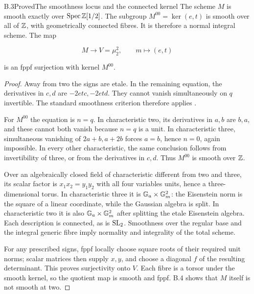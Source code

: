 \begin{statement}{B.3}{Proved}{The smoothness locus and the connected kernel}
The scheme $M$ is smooth exactly over $\operatorname{Spec}\mathbb Z[1/2]$.
The subgroup $M^{00}=\ker(e,t)$ is smooth over all of $\mathbb Z$,
with geometrically connected fibres. It is therefore a
normal integral scheme. The map

$$
M\longrightarrow V=\mu_2^2,\qquad m\longmapsto(e,t)
$$

is an fppf surjection with kernel $M^{00}$.
\end{statement}
\begin{proof}
Away from two the signs are etale. In the remaining equation,
the derivatives in $c,d$ are $-2etc,-2etd$.
They cannot vanish simultaneously on $q$ invertible.
The standard smoothness criterion therefore applies
\cite[Lemma10.137.6]{AB_Stacks}.

For $M^{00}$ the equation is $n=q$.
In characteristic two, its derivatives in $a,b$ are $b,a$,
and these cannot both vanish because $n=q$ is a unit.
In characteristic three, simultaneous vanishing of
$2a+b,a+2b$ forces $a=b$, hence $n=0$, again impossible.
In every other characteristic, the same conclusion follows
from invertibility of three, or from the derivatives in $c,d$.
Thus $M^{00}$ is smooth over $\mathbb Z$.

Over an algebraically closed field of characteristic different
from two and three, its scalar factor is
$x_1x_2=y_1y_2$ with all four variables units, hence a
three-dimensional torus. In characteristic three it is
$\mathbb G_a\times\mathbb G_m^2$: the Eisenstein norm is the square of a
linear coordinate, while the Gaussian algebra is split.
In characteristic two it is also $\mathbb G_a\times\mathbb G_m^2$ after
splitting the etale Eisenstein algebra.
Each description is connected, as is $\operatorname{SL}_2$.
Smoothness over the regular base and the integral generic
fibre imply normality and integrality of the total scheme.

For any prescribed signs, fppf locally choose square roots
of their required unit norms; scalar matrices then supply
$x,y$, and choose a diagonal $f$ of the resulting determinant.
This proves surjectivity onto $V$. Each fibre is a torsor
under the smooth kernel, so the quotient map is smooth
and fppf. B.4 shows that $M$ itself is not smooth at two.
\end{proof}

